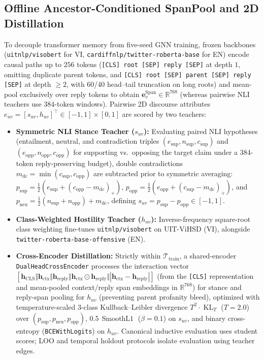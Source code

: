 \documentclass[conference]{IEEEtran}
\begin{document}
\subsection{Offline Ancestor-Conditioned SpanPool and 2D Distillation}
To decouple transformer memory from five-seed GNN training, frozen backbones (\texttt{uitnlp/visobert} for VI, \texttt{cardiffnlp/twitter-roberta-base} for EN) encode causal paths up to $256$ tokens (\texttt{[CLS] root [SEP] reply [SEP]} at depth $1$, omitting duplicate parent tokens, and \texttt{[CLS] root [SEP] parent [SEP] reply [SEP]} at depth $\ge 2$, with 60/40 head--tail truncation on long roots) and mean-pool exclusively over reply tokens to obtain $\mathbf{e}_v^{\text{Span}} \in \mathbb{R}^{768}$ (whereas pairwise NLI teachers use $384$-token windows). Pairwise 2D discourse attributes $e_{uv} = [s_{uv}, h_{uv}]^\top \in [-1, 1] \times [0, 1]$ are scored by two teachers:
\begin{itemize}
    \item \textbf{Symmetric NLI Stance Teacher ($s_{uv}$):} Evaluating paired NLI hypotheses (entailment, neutral, and contradiction triples $(e_{\text{sup}}, n_{\text{sup}}, c_{\text{sup}})$ and $(e_{\text{opp}}, n_{\text{opp}}, c_{\text{opp}})$ for supporting vs.\ opposing the target claim under a 384-token reply-preserving budget), double contradictions $m_{\text{dc}} = \min(c_{\text{sup}}, c_{\text{opp}})$ are subtracted prior to symmetric averaging: $p_{\text{sup}} = \tfrac{1}{2}(e_{\text{sup}} + (c_{\text{opp}} - m_{\text{dc}})_+)$, $p_{\text{opp}} = \tfrac{1}{2}(e_{\text{opp}} + (c_{\text{sup}} - m_{\text{dc}})_+)$, and $p_{\text{neu}} = \tfrac{1}{2}(n_{\text{sup}} + n_{\text{opp}}) + m_{\text{dc}}$, defining $s_{uv} = p_{\text{sup}} - p_{\text{opp}} \in [-1, 1]$.
    \item \textbf{Class-Weighted Hostility Teacher ($h_{uv}$):} Inverse-frequency square-root class weighting fine-tunes \texttt{uitnlp/visobert} on UIT-ViHSD \cite{luu2021vihsd} (VI), alongside \texttt{twitter-roberta-base-offensive} \cite{barbieri2020tweeteval} (EN).
    \item \textbf{Cross-Encoder Distillation:} Strictly within $\mathcal{T}_{\text{train}}$, a shared-encoder \texttt{DualHeadCrossEncoder} processes the interaction vector $[\mathbf{h}_{\text{CLS}} \Vert \mathbf{h}_{\text{ctx}} \Vert \mathbf{h}_{\text{reply}} \Vert \mathbf{h}_{\text{ctx}} \odot \mathbf{h}_{\text{reply}} \Vert |\mathbf{h}_{\text{ctx}} - \mathbf{h}_{\text{reply}}|]$ (from the \texttt{[CLS]} representation and mean-pooled context/reply span embeddings in $\mathbb{R}^{768}$) for stance and reply-span pooling for $h_{uv}$ (preventing parent profanity bleed), optimized with temperature-scaled 3-class Kullback--Leibler divergence $T^2 \cdot \operatorname{KL}_T$ ($T=2.0$) over $(p_{\text{sup}}, p_{\text{neu}}, p_{\text{opp}})$, $0.5\,\operatorname{SmoothL1}$ ($\beta=0.1$) on $s_{uv}$, and binary cross-entropy (\texttt{BCEWithLogits}) on $h_{uv}$. Canonical inductive evaluation uses student scores; LOO and temporal holdout protocols isolate evaluation using teacher edges.
\end{itemize}
\end{document}
